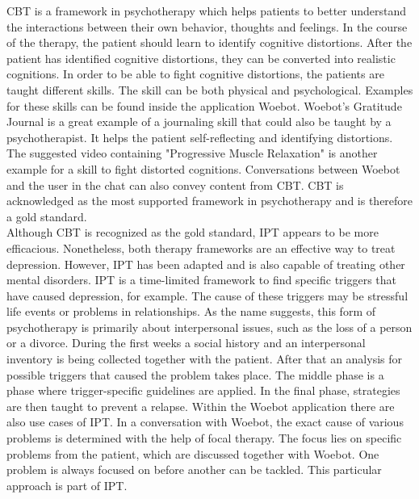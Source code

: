 CBT is a framework in psychotherapy which helps patients to better understand the interactions between their own behavior, thoughts and feelings.
In the course of the therapy, the patient should learn to identify cognitive distortions.
After the patient has identified cognitive distortions, they can be converted into realistic cognitions.
In order to be able to fight cognitive distortions, the patients are taught different skills.
The skill can be both physical and psychological.
Examples for these skills can be found inside the application Woebot.
Woebot's Gratitude Journal is a great example of a journaling skill that could also be taught by a psychotherapist.
It helps the patient self-reflecting and identifying distortions.
The suggested video containing "Progressive Muscle Relaxation" is another example for a skill to fight distorted cognitions.
Conversations between Woebot and the user in the chat can also convey content from CBT.
CBT is acknowledged as the most supported framework in psychotherapy and is therefore a gold standard\cite{gold-standard}.\\

Although CBT is recognized as the gold standard, IPT appears to be more efficacious\cite{depression-adults}.
Nonetheless, both therapy frameworks are an effective way to treat depression\cite{ipt-depression}.
However, IPT has been adapted and is also capable of treating other mental disorders\cite{ipt-mental-health}.
IPT is a time-limited framework to find specific triggers that have caused depression, for example.
The cause of these triggers may be stressful life events or problems in relationships.
As the name suggests, this form of psychotherapy is primarily about interpersonal issues, such as the loss of a person or a divorce.
During the first weeks a social history and an interpersonal inventory is being collected together with the patient.
After that an analysis for possible triggers that caused the problem takes place.
The middle phase is a phase where trigger-specific guidelines are applied.
In the final phase, strategies are then taught to prevent a relapse.
Within the Woebot application there are also use cases of IPT.
In a conversation with Woebot, the exact cause of various problems is determined with the help of focal therapy.
The focus lies on specific problems from the patient, which are discussed together with Woebot.
One problem is always focused on before another can be tackled.
This particular approach is part of IPT.\\

